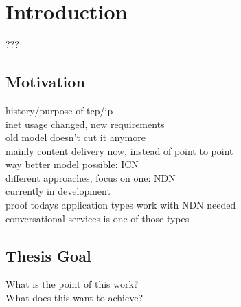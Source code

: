 \chapter{Introduction} \label{chapter:Introduction}
???

\section{Motivation}
history/purpose of tcp/ip \\
inet usage changed, new requirements \\
old model doesn't cut it anymore \\
mainly content delivery now, instead of point to point \\
way better model possible: ICN \\
different approaches, focus on one: NDN \\
currently in development \\
proof todays application types work with NDN needed\\
conversational services is one of those types \\

\section{Thesis Goal}
What is the point of this work? \\
What does this want to achieve? \\

